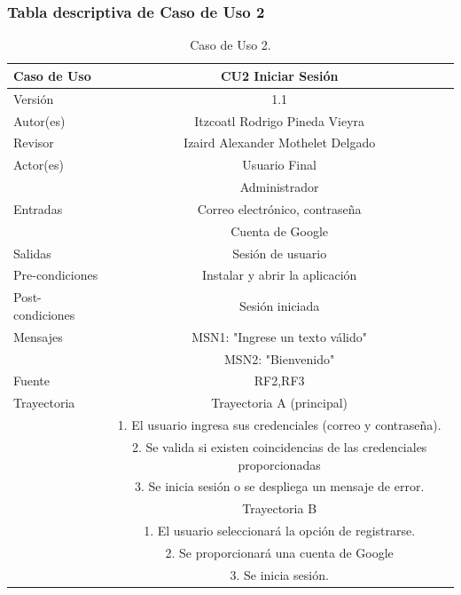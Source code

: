 \documentclass{article}
\begin{document}
\subsubsection{Tabla descriptiva de Caso de Uso 2}
\begin{table}[H]
\caption{Caso de Uso 2.}
\begin{tabular}{|M{5cm}|c|}
\hline
Caso de Uso & CU2 Iniciar Sesión\\ \hline
Versión & 1.1\\ \hline
Autor(es) & Itzcoatl Rodrigo Pineda Vieyra\\ \hline
Revisor & Izaird Alexander Mothelet Delgado \\ \hline
Actor(es) & Usuario Final \\ & Administrador\\ \hline
Entradas &  Correo electrónico, contraseña\\ & Cuenta de Google \\ \hline
Salidas & Sesión de usuario \\ \hline
Pre-condiciones & Instalar y abrir la aplicación \\ \hline
Post-condiciones & Sesión iniciada\\ \hline
Mensajes & MSN1: "Ingrese un texto válido"\\
		   & MSN2: "Bienvenido"\\ \hline
Fuente & RF2,RF3 \\ \hline	
	Trayectoria & Trayectoria A (principal)\\
		& 1.   El usuario ingresa sus credenciales (correo y contraseña).\\
		& 2.   Se valida si existen coincidencias de las credenciales proporcionadas\\
		& 3. Se inicia sesión o se despliega un mensaje de error.\\
	& Trayectoria B\\
	& 1.   El usuario seleccionará la opción de registrarse.\\
	& 2.   Se proporcionará una cuenta de Google\\
	& 3.   Se inicia sesión.\\ \hline
\end{tabular}
\end{table}
\end{document}
